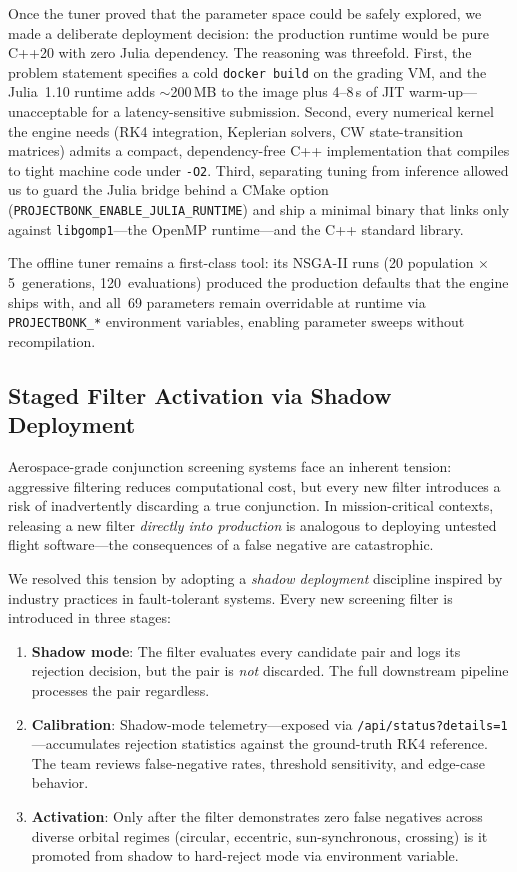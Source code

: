 \documentclass[10pt,twocolumn,letterpaper]{article}
\begin{document}
Once the tuner proved that the parameter space could be safely explored, we
made a deliberate deployment decision: the production runtime would be pure
C++20 with zero Julia dependency.  The reasoning was threefold.  First, the
problem statement specifies a cold \texttt{docker build} on the grading
VM, and the Julia~1.10 runtime adds $\sim$200\,MB to the image plus 4--8\,s
of JIT warm-up---unacceptable for a latency-sensitive submission.  Second,
every numerical kernel the engine needs (RK4 integration, Keplerian solvers,
CW state-transition matrices) admits a compact, dependency-free C++
implementation that compiles to tight machine code under \texttt{-O2}.
Third, separating tuning from inference allowed us to guard the Julia
bridge behind a CMake option (\texttt{PROJECTBONK\_ENABLE\_JULIA\_RUNTIME})
and ship a minimal binary that links only against \texttt{libgomp1}---the
OpenMP runtime---and the C++ standard library.

The offline tuner remains a first-class tool: its NSGA-II runs (20
population $\times$ 5~generations, 120~evaluations) produced the
production defaults that the engine ships with, and all~69 parameters
remain overridable at runtime via \texttt{PROJECTBONK\_*} environment
variables, enabling parameter sweeps without recompilation.

\subsection{Staged Filter Activation via Shadow Deployment}

Aerospace-grade conjunction screening systems face an inherent tension:
aggressive filtering reduces computational cost, but every new filter
introduces a risk of inadvertently discarding a true conjunction.  In
mission-critical contexts, releasing a new filter \emph{directly into
production} is analogous to deploying untested flight software---the
consequences of a false negative are catastrophic.

We resolved this tension by adopting a \emph{shadow deployment} discipline
inspired by industry practices in fault-tolerant systems.  Every new
screening filter is introduced in three stages:

\begin{enumerate}[nosep,leftmargin=*]
  \item \textbf{Shadow mode}: The filter evaluates every candidate pair
    and logs its rejection decision, but the pair is \emph{not} discarded.
    The full downstream pipeline processes the pair regardless.
  \item \textbf{Calibration}: Shadow-mode telemetry---exposed via
    \texttt{/api/status?details=1}---accumulates rejection statistics
    against the ground-truth RK4 reference.  The team reviews false-negative
    rates, threshold sensitivity, and edge-case behavior.
  \item \textbf{Activation}: Only after the filter demonstrates zero false
    negatives across diverse orbital regimes (circular, eccentric,
    sun-synchronous, crossing) is it promoted from shadow to hard-reject
    mode via environment variable.
\end{enumerate}
\end{document}

